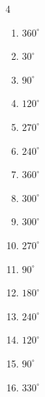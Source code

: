 \begin{multicols}{4}
\begin{enumerate}
  \item $\displaystyle 360^{\circ}$
        \phantom{$\displaystyle =2\pi$}

  \item $\displaystyle 30^{\circ}$

  \item $\displaystyle 90^{\circ}$

  \item $\displaystyle 120^{\circ}$

  \item $\displaystyle 270^{\circ}$

  \item $\displaystyle 240^{\circ}$

  \item $\displaystyle 360^{\circ}$
        \phantom{$\displaystyle =2\pi$}

  \item $\displaystyle 300^{\circ}$

  \item $\displaystyle 300^{\circ}$

\columnbreak %

  \item $\displaystyle 270^{\circ}$

  \item $\displaystyle 90^{\circ}$

  \item $\displaystyle 180^{\circ}$
        \phantom{$\displaystyle =\pi$}

  \item $\displaystyle 240^{\circ}$

  \item $\displaystyle 120^{\circ}$

  \item $\displaystyle 90^{\circ}$

  \item $\displaystyle 330^{\circ}$


\end{enumerate}
\end{multicols}
